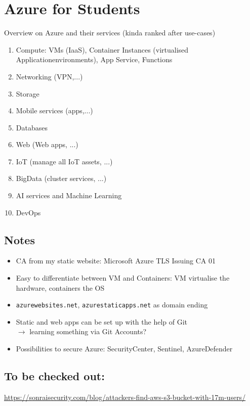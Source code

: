 \documentclass[12pt]{article}
\begin{document}
\thispagestyle{firstpage}

\section*{Azure for Students}
Overview on Azure and their services (kinda ranked after use-cases)
\begin{enumerate}
    \item Compute: VMs (IaaS), Container Instances (virtualised Applicationenvironments), App Service, Functions
    \item Networking (VPN,...)
    \item Storage
    \item Mobile services (apps,...)
    \item Databases
    \item Web (Web apps, ...)
    \item IoT (manage all IoT assets, ...)
    \item BigData (cluster services, ...)
    \item AI services and Machine Learning
    \item DevOps
\end{enumerate}


\subsection*{Notes}
\begin{itemize}
    \item CA from my static website: Microsoft Azure TLS Issuing CA 01
    \item Easy to differentiate between VM and Containers: VM virtualise the hardware, containers the OS
    \item \verb|azurewebsites.net|, \verb|azurestaticapps.net| as domain ending
    \item Static and web apps can be set up with the help of Git \\ 
    $\rightarrow$ learning something via Git Accounts?
    \item Possibilities to secure Azure: SecurityCenter,  Sentinel,  AzureDefender
\end{itemize}

\subsection*{To be checked out:}
\url{https://sonraisecurity.com/blog/attackers-find-aws-s3-bucket-with-17m-users/} \\ \\
\end{document}
